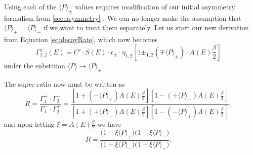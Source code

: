 Using each of the $\langle P\rangle_\pm$ values requires modification of our initial
asymmetry formalism from \ref{sec:asymmetry} \cite{ARYoungPol}. We can no longer make
the assumption that $\langle P\rangle_+ = \langle P\rangle_-$ if we want to treat them
separately. Let us start our new derivation from Equation \ref{eq:decayRate}, which now
becomes
%
\begin{equation} \label{eq:POLdecayRate}
  \Gamma_{1,2}^{\pm}\left(E\right)=C' \cdot S(E) \cdot \epsilon_{\pm} \cdot \eta_{1,2}
  \left[ 1 \pm_{1,2} 
    \left(\mp \langle P \rangle_\pm \right) \cdot A(E) \frac{\beta}{2} \right]
\end{equation}
%
\noindent under the substition $\langle P\rangle \rightarrow \langle P\rangle_\pm$.

The super-ratio now must be written as
%
\begin{equation*}
  R = \frac{\Gamma_{1}^+ \cdot \Gamma_{2}^-}{\Gamma_{1}^- \cdot \Gamma_{2}^+} 
  =  \frac{ \left[ 1 + \left(- \langle P \rangle_+ \right)  A(E) \frac{\beta}{2} \right] 
\left[ 1 - \left(+ \langle P \rangle_- \right)  A(E) \frac{\beta}{2} \right]  }
{  \left[ 1 +  \left(+ \langle P \rangle_- \right)  A(E) \frac{\beta}{2}  \right] 
 \left[ 1 -  \left(- \langle P \rangle_+ \right)  A(E) \frac{\beta}{2} \right]},
\end{equation*}
%
\noindent and upon letting $\xi = A(E)\frac{\beta}{2}$ we have
%
\begin{equation} \label{eq:polR}
  R =  \frac{ \Big( 1 - \xi \langle P \rangle_+ \Big)
    \Big( 1 - \xi \langle P \rangle_- \Big) }
{  \Big( 1 + \xi \langle P \rangle_- \Big)
    \Big( 1 + \xi \langle P \rangle_+ \Big) }.
\end{equation}

